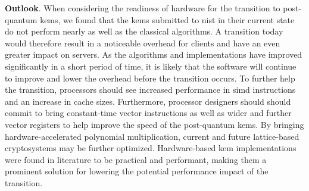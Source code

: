 


\textbf{Outlook}. When considering the readiness of hardware for the transition to \gls{post-quantum} \glspl{kem}, we found that the \glspl{kem} submitted to \gls{nist} in their current state do not perform nearly as well as the classical algorithms. A transition today would therefore result in a noticeable overhead for clients and have an even greater impact on servers. As the algorithms and implementations have improved significantly in a short period of time, it is likely that the software will continue to improve and lower the overhead before the transition occurs. To further help the transition, processors should see increased performance in \gls{simd} instructions and an increase in cache sizes. Furthermore, processor designers should should commit to bring constant-time vector instructions as well as wider and further vector registers to help improve the speed of the \gls{post-quantum} \glspl{kem}. By bringing hardware-accelerated polynomial multiplication, current and future lattice-based cryptosystems may be further optimized. Hardware-based \gls{kem} implementations were found in literature to be practical and performant, making them a prominent solution for lowering the potential performance impact of the transition.


